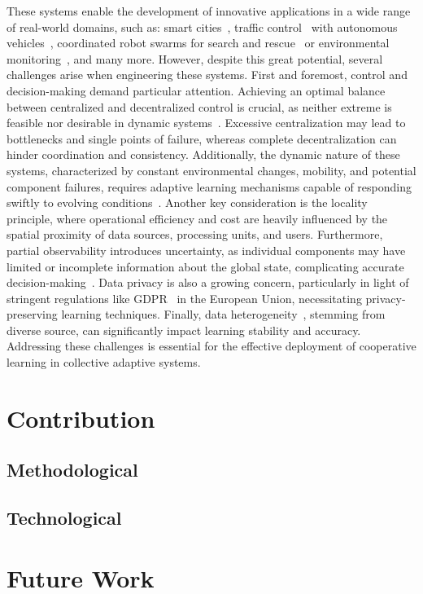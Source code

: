 \documentclass[12pt]{article}
\begin{document}
These systems enable the development of innovative applications in a wide range of real-world domains, such as: 
 smart cities~\cite{DBLP:conf/icse/IftikharRBW017}, 
 traffic control~\cite{DBLP:journals/tits/ChuWCL20,DBLP:books/sp/Muller2011/ProthmannTBHMS11} 
 with autonomous vehicles~\cite{DBLP:journals/corr/BojarskiTDFFGJM16}, 
 coordinated robot swarms for search and rescue~\cite{DBLP:journals/ijon/ZhouLLXS21} 
 or environmental monitoring~\cite{DBLP:conf/acsos/AguzziVE23}, and many more.
%
However, despite this great potential, several challenges arise when engineering these systems.
%
First and foremost, control and decision-making demand particular attention.
%
Achieving an optimal balance between centralized and decentralized control is crucial, 
 as neither extreme is feasible nor desirable in dynamic systems~\cite{DBLP:conf/coordination/CasadeiPVN19}. 
% 
Excessive centralization may lead to bottlenecks and single points of failure, 
 whereas complete decentralization can hinder coordination and consistency.
%
Additionally, the dynamic nature of these systems, characterized by constant 
 environmental changes, mobility, and potential component failures, requires adaptive 
 learning mechanisms capable of responding swiftly 
 to evolving conditions~\cite{DBLP:journals/swarm/PrasetyoMF19}.
%
Another key consideration is the locality principle, where operational efficiency and cost 
 are heavily influenced by the spatial proximity of data sources, processing units, and users.
%
Furthermore, partial observability introduces uncertainty, as individual components may have 
 limited or incomplete information about the global state, complicating accurate 
 decision-making~\cite{DBLP:conf/uai/HeDB22}.
%
Data privacy is also a growing concern, particularly in light of stringent regulations like GDPR~\cite{GDPR}
 in the European Union, necessitating privacy-preserving learning techniques.
%
Finally, data heterogeneity~\cite{DBLP:journals/fgcs/MaZLCQ22,DBLP:journals/ijon/ZhuXLJ21},
 stemming from diverse source, can significantly impact learning stability and accuracy.
%
Addressing these challenges is essential for the effective deployment of cooperative learning 
 in collective adaptive systems.



\section{Contribution}\label{sec:contribution}

\subsection{Methodological}

\subsection{Technological}


\section{Future Work}\label{sec:future}




\end{document}
